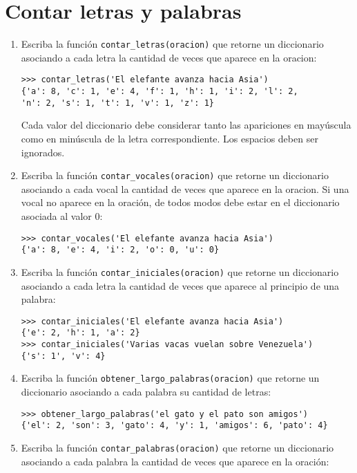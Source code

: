 \section{Contar letras y palabras}

\begin{enumerate}
\item
  Escriba la función \lstinline!contar_letras(oracion)! que retorne un
  diccionario asociando a cada letra la cantidad de veces que aparece en
  la oracion:

\begin{lstlisting}
>>> contar_letras('El elefante avanza hacia Asia')
{'a': 8, 'c': 1, 'e': 4, 'f': 1, 'h': 1, 'i': 2, 'l': 2,
'n': 2, 's': 1, 't': 1, 'v': 1, 'z': 1}
\end{lstlisting}

  Cada valor del diccionario debe considerar tanto las apariciones en
  mayúscula como en minúscula de la letra correspondiente. Los espacios
  deben ser ignorados.
\item
  Escriba la función \lstinline!contar_vocales(oracion)! que retorne un
  diccionario asociando a cada vocal la cantidad de veces que aparece en
  la oracion. Si una vocal no aparece en la oración, de todos modos debe
  estar en el diccionario asociada al valor 0:

\begin{lstlisting}
>>> contar_vocales('El elefante avanza hacia Asia')
{'a': 8, 'e': 4, 'i': 2, 'o': 0, 'u': 0}
\end{lstlisting}
\item
  Escriba la función \lstinline!contar_iniciales(oracion)! que retorne
  un diccionario asociando a cada letra la cantidad de veces que aparece
  al principio de una palabra:

\begin{lstlisting}
>>> contar_iniciales('El elefante avanza hacia Asia')
{'e': 2, 'h': 1, 'a': 2}
>>> contar_iniciales('Varias vacas vuelan sobre Venezuela')
{'s': 1', 'v': 4}
\end{lstlisting}
\item
  Escriba la función \lstinline!obtener_largo_palabras(oracion)! que
  retorne un diccionario asociando a cada palabra su cantidad de letras:

\begin{lstlisting}
>>> obtener_largo_palabras('el gato y el pato son amigos')
{'el': 2, 'son': 3, 'gato': 4, 'y': 1, 'amigos': 6, 'pato': 4}
\end{lstlisting}
\item
  Escriba la función \lstinline!contar_palabras(oracion)! que retorne un
  diccionario asociando a cada palabra la cantidad de veces que aparece
  en la oración:


\end{enumerate}
